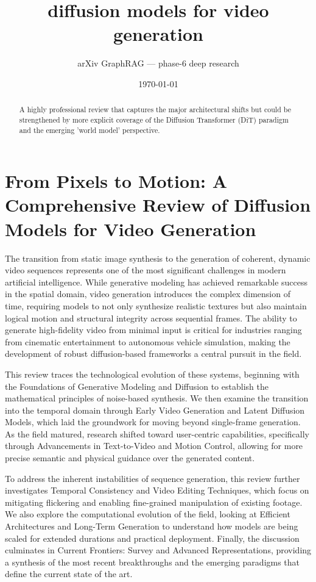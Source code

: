 \documentclass[11pt]{article}
\title{diffusion models for video generation}
\author{arXiv GraphRAG --- phase-6 deep research}
\date{\today}
\begin{document}
\maketitle

\begin{abstract}
A highly professional review that captures the major architectural shifts but could be strengthened by more explicit coverage of the Diffusion Transformer (DiT) paradigm and the emerging 'world model' perspective.
\end{abstract}

\section{From Pixels to Motion: A Comprehensive Review of Diffusion Models for Video Generation}

The transition from static image synthesis to the generation of coherent, dynamic video sequences represents one of the most significant challenges in modern artificial intelligence. While generative modeling has achieved remarkable success in the spatial domain, video generation introduces the complex dimension of time, requiring models to not only synthesize realistic textures but also maintain logical motion and structural integrity across sequential frames. The ability to generate high-fidelity video from minimal input is critical for industries ranging from cinematic entertainment to autonomous vehicle simulation, making the development of robust diffusion-based frameworks a central pursuit in the field.

This review traces the technological evolution of these systems, beginning with the Foundations of Generative Modeling and Diffusion to establish the mathematical principles of noise-based synthesis. We then examine the transition into the temporal domain through Early Video Generation and Latent Diffusion Models, which laid the groundwork for moving beyond single-frame generation. As the field matured, research shifted toward user-centric capabilities, specifically through Advancements in Text-to-Video and Motion Control, allowing for more precise semantic and physical guidance over the generated content.

To address the inherent instabilities of sequence generation, this review further investigates Temporal Consistency and Video Editing Techniques, which focus on mitigating flickering and enabling fine-grained manipulation of existing footage. We also explore the computational evolution of the field, looking at Efficient Architectures and Long-Term Generation to understand how models are being scaled for extended durations and practical deployment. Finally, the discussion culminates in Current Frontiers: Survey and Advanced Representations, providing a synthesis of the most recent breakthroughs and the emerging paradigms that define the current state of the art.
\end{document}

